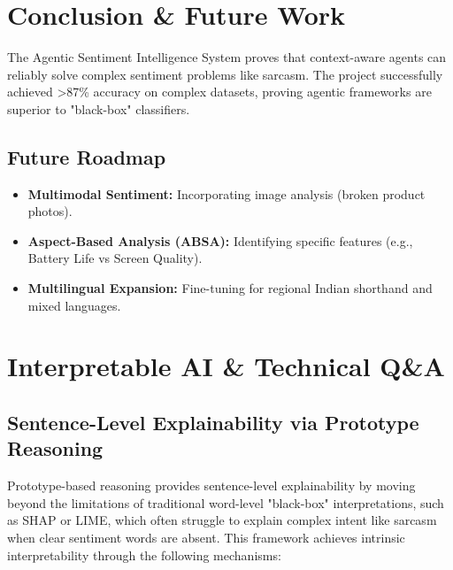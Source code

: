 \documentclass[11pt,oneside]{scrbook}
\begin{document}
\chapter{Conclusion \& Future Work}
The Agentic Sentiment Intelligence System proves that context-aware agents can reliably solve complex sentiment problems like sarcasm. The project successfully achieved >87\% accuracy on complex datasets, proving agentic frameworks are superior to "black-box" classifiers.

\section{Future Roadmap}
\begin{itemize}
    \item \textbf{Multimodal Sentiment:} Incorporating image analysis (broken product photos).
    \item \textbf{Aspect-Based Analysis (ABSA):} Identifying specific features (e.g., Battery Life vs Screen Quality).
    \item \textbf{Multilingual Expansion:} Fine-tuning for regional Indian shorthand and mixed languages.
\end{itemize}

\appendix
\chapter{Interpretable AI \& Technical Q\&A}

\section{Sentence-Level Explainability via Prototype Reasoning}
Prototype-based reasoning provides sentence-level explainability by moving beyond the limitations of traditional word-level "black-box" interpretations, such as SHAP or LIME, which often struggle to explain complex intent like sarcasm when clear sentiment words are absent. This framework achieves intrinsic interpretability through the following mechanisms:
\end{document}
